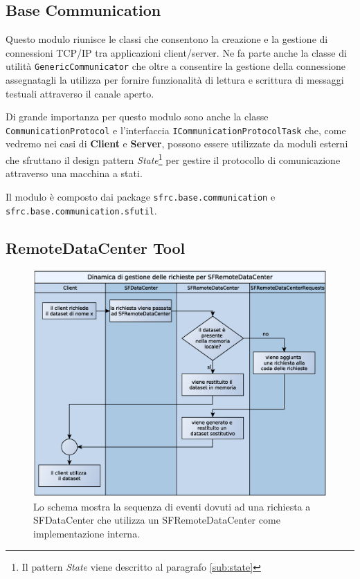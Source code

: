 
\subsection{Base Communication}
\label{sub:basecommodule}
Questo modulo riunisce le classi che consentono la creazione e la gestione di connessioni TCP/IP tra applicazioni client/server. Ne fa parte anche la classe di utilit\`a \texttt{GenericCommunicator} che oltre a consentire la gestione della connessione assegnatagli la utilizza per fornire funzionalit\`a di lettura e scrittura di messaggi testuali attraverso il canale aperto.

Di grande importanza per questo modulo sono anche la classe \texttt{CommunicationProtocol} e l'interfaccia \texttt{ICommunicationProtocolTask} che, come vedremo nei casi di \textbf{Client} e \textbf{Server}, possono essere utilizzate da moduli esterni che sfruttano il design pattern \textit{State}\footnote{Il pattern \textit{State} viene descritto al paragrafo \ref{sub:state}} per gestire il protocollo di comunicazione attraverso una macchina a stati.

Il modulo \`e composto dai package \texttt{sfrc.base.communication} e \\\texttt{sfrc.base.communication.sfutil}.

\subsection{RemoteDataCenter Tool}
\label{sub:remotedatacentertoolmodule}

\begin{figure}[t]
\begin{center}
\includegraphics[width=\textwidth]{Immagini/DinamicaSFRemoteDataCenter}
\caption{Lo schema mostra la sequenza di eventi dovuti ad una richiesta a SFDataCenter che utilizza un SFRemoteDataCenter come implementazione interna.\label{f:dinamicasfremotedatacenter}} 
\end{center} 
\end{figure}

